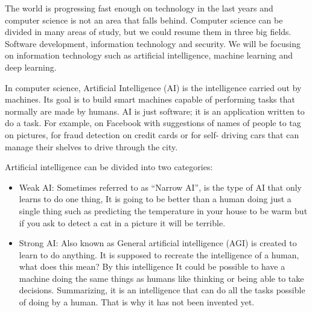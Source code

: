 \begin{sloppypar}
The world is progressing fast enough on technology in the last years and computer science is not 
an area that falls behind. Computer science can be divided in many areas of study, but we could 
resume  them in three big fields. Software  development,  information technology and security. 
We will be focusing on information technology such as artificial intelligence, machine learning 
and deep learning. 
\par
In  computer  science,  Artificial  Intelligence  (AI)  is  the  intelligence  carried  out  by  machines.  Its 
goal is to build smart machines capable of performing tasks that normally are made by humans.  
AI  is  just  software;  it  is  an  application  written  to  do  a  task.  For  example,  on  Facebook  with 
suggestions of names of people to tag on pictures, for fraud detection on credit cards or for self-
driving cars that can manage their shelves to drive through the city. 
\par
Artificial intelligence can be divided into two categories:
\begin{itemize}
    \item Weak AI: Sometimes referred to as “Narrow AI”, is the type of AI that only learns to do 
    one  thing,  It  is  going  to  be  better  than  a  human  doing  just  a  single  thing  such  as 
    predicting the temperature in your house to be warm but if you ask to detect a cat in a 
    picture it will be terrible.
    \item Strong  AI:  Also  known  as  General  artificial  intelligence  (AGI)  is  created  to  learn  to  do 
    anything. It is supposed to recreate the intelligence of a human, what does this mean? 
    By  this  intelligence  It  could  be  possible  to  have  a  machine  doing  the  same  things  as 
    humans like thinking or being able to take decisions. Summarizing, it is an intelligence 
    that  can  do  all  the  tasks  possible  of  doing  by  a  human.  That  is  why  it  has  not  been 
    invented yet. 
\end{itemize}



\end{sloppypar}
